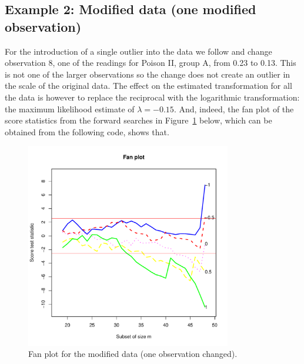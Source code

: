 \documentclass[article,shortnames,nojss]{jss}
\begin{document}
\subsection[Example 2: Modified poison data (one modified observation)]{Example 2: Modified  data (one modified observation)}

For the introduction of a single outlier into the data we follow \citet{andrews:1971} and change observation 8, one of the readings for Poison II, group A, from 0.23 to 0.13. This is not one of the larger observations so the change does not create an outlier in the scale of the original data. The effect on the estimated transformation for all the data is however to replace the reciprocal with the logarithmic transformation: the maximum likelihood estimate of  $\lambda=-0.15$. And, indeed, the fan plot of the score statistics from the forward searches in Figure~\ref{fig:ex-2} below, which can be obtained from the following code, shows that.

\begin{Schunk}
\end{Schunk}

\begin{center}
\begin{figure}[H]
\includegraphics[width=0.8\textwidth]{transreg-ex-2}
\caption{Fan plot for the modified  data (one observation changed).}
\label{fig:ex-2}
\end{figure}
\end{center}
\end{document}

